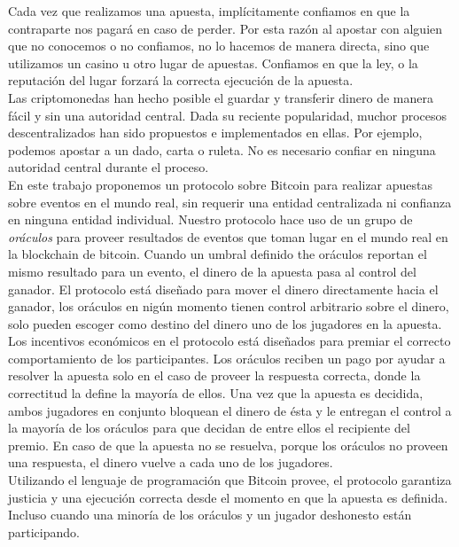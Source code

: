 Cada vez que realizamos una apuesta, implícitamente confiamos en que la
  contraparte nos pagar\'a en caso de perder.
Por esta raz\'on al apostar con alguien que no conocemos o no confiamos,
  no lo hacemos de manera directa, sino que utilizamos un casino u otro lugar de
  apuestas.
Confiamos en que la ley, o la reputaci\'on del lugar forzar\'a la correcta
  ejecuci\'on de la apuesta.\\
\noindent
 Las criptomonedas han hecho posible el guardar y transferir dinero de manera
   f\'acil y sin una autoridad central.
Dada su reciente popularidad, muchor procesos descentralizados han sido
  propuestos e implementados en ellas.
Por ejemplo, podemos apostar a un dado, carta o ruleta. No es necesario confiar
  en ninguna autoridad central durante el proceso.\\
\noindent
En este trabajo proponemos un protocolo sobre Bitcoin para realizar apuestas
  sobre eventos en el mundo real, sin requerir una entidad centralizada ni
  confianza en ninguna entidad individual.
Nuestro protocolo hace uso de un grupo de \textit{or\'aculos} para proveer
  resultados de eventos que toman lugar en el mundo real en la blockchain de
  bitcoin.
Cuando un umbral definido the or\'aculos reportan el mismo resultado para un
  evento, el dinero de la apuesta pasa al control del ganador.
El protocolo est\'a dise\~nado para mover el dinero directamente hacia el
  ganador, los or\'aculos en nig\'un momento tienen control arbitrario sobre
  el dinero, solo pueden escoger como destino del dinero uno de los
  jugadores en la apuesta.\\
\noindent
Los incentivos econ\'omicos en el protocolo est\'a dise\~nados para premiar
  el correcto comportamiento de los participantes.
Los or\'aculos reciben un pago por ayudar a resolver la apuesta solo en el
  caso de proveer la respuesta correcta, donde la correctitud la define
  la mayor\'ia de ellos.
Una vez que la apuesta es decidida, ambos jugadores en conjunto bloquean
  el dinero de \'esta y le entregan el control a la mayor\'ia de los or\'aculos
  para que decidan de entre ellos el recipiente del premio.
En caso de que la apuesta no se resuelva, porque los or\'aculos no proveen
  una respuesta, el dinero vuelve a cada uno de los jugadores.\\
\noindent
Utilizando el lenguaje de programaci\'on que Bitcoin provee, el protocolo
  garantiza justicia y una ejecuci\'on correcta desde el momento en que
  la apuesta es definida. Incluso cuando una minor\'ia de los or\'aculos y
  un jugador deshonesto est\'an participando.
